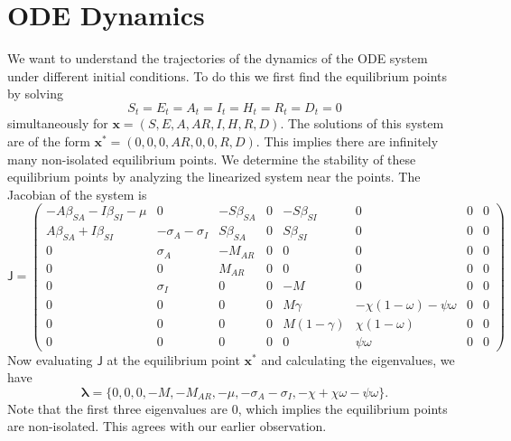 \documentclass[11pt]{article}
\renewcommand\vec{\mathbf}
\newcommand{\mat}[1]{\mathsf{#1}}
\begin{document}
\section{ODE Dynamics}
	We want to understand the trajectories of the dynamics of the ODE system under different initial conditions.
	To do this we first find the equilibrium points by solving
	$$S_t = E_t = A_t = I_t = H_t = R_t = D_t = 0$$
	simultaneously for $\vec{x} = (S, E, A, AR, I, H, R, D)$.
	The solutions of this system are of the form $\vec{x^*} = (0, 0 , 0, AR, 0, 0, R, D)$.
	This implies there are infinitely many non-isolated equilibrium points.
	We determine the stability of these equilibrium points by analyzing the linearized system near the points.
	The Jacobian of the system is
	\begin{equation}
		\mat{J} = \begin{pmatrix}
			- A \beta_{SA} - I \beta_{SI} - \mu	&	0						&	- S \beta_{SA}	&	0	&	- S \beta_{SI}	&	0									&	0	&	0	\\
			A \beta_{SA} + I \beta_{SI}			&	- \sigma_A - \sigma_I	&	S \beta_{SA}	&	0	&	S \beta_{SI}	&	0									&	0	&	0	\\
			0									&	\sigma_A				&	- M_{AR}		&	0	&	0				&	0									&	0	&	0	\\
			0									&	0						&	M_{AR}			&	0	&	0				&	0									&	0	&	0	\\
			0									&	\sigma_I				&	0				&	0	&	- M				&	0									&	0	&	0	\\
			0									&	0						&	0				&	0	&	M \gamma		&	- \chi (1 - \omega) - \psi \omega	&	0	&	0	\\
			0									&	0						&	0				&	0	&	M (1 - \gamma)	&	\chi (1 - \omega)					&	0	&	0	\\
			0									&	0						&	0				&	0	&	0				&	\psi \omega							&	0	&	0
		\end{pmatrix}
	\end{equation}
	Now evaluating $\mat{J}$ at the equilibrium point $\vec{x^*}$ and calculating the eigenvalues, we have
	\begin{equation}
		\vec{\lambda} = \{0 , 0, 0, - M, - M_{AR}, - \mu, - \sigma_A - \sigma_I, - \chi + \chi \omega - \psi \omega \}.
	\end{equation}
	Note that the first three eigenvalues are 0, which implies the equilibrium points are non-isolated.
	This agrees with our earlier observation.
	
\end{document}
